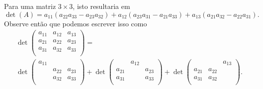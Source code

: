 \begin{exemplo}
    Para uma matriz $3\times 3$, isto resultaria em
    \begin{equation*}
        \det(A)=a_{11}(a_{22}a_{33}-a_{23}a_{32}) + a_{12}(a_{23}a_{31}-a_{21}a_{33})+a_{13}(a_{21}a_{32}-a_{22}a_{31}).
    \end{equation*}
    Observe então que podemos escrever isso como
    \begin{multline*}
        \det{\begin{pmatrix}
                a_{11} &a_{12} & a_{13}\\
                a_{21} &a_{22} & a_{23}\\
                a_{31} &a_{32} & a_{33}\\
            \end{pmatrix}} = \\
            \det{\begin{pmatrix}
                a_{11} &  &  \\
                 &a_{22} & a_{23}\\
                 &a_{32} & a_{33}\\
            \end{pmatrix}} + \det{\begin{pmatrix}
                & a_{12} &  \\
                a_{21} & & a_{23}\\
                a_{31} & & a_{33}\\
            \end{pmatrix}} + \det{\begin{pmatrix}
                & & a_{13} \\
                a_{21} & a_{22} & \\
                a_{31} & a_{32} & \\
            \end{pmatrix}}.
    \end{multline*}
\end{exemplo}

